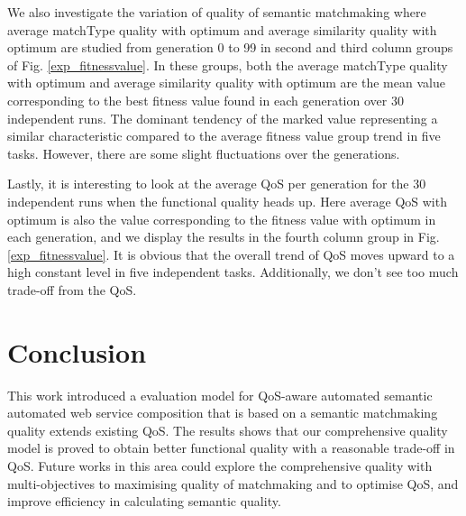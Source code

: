 \documentclass{llncs}
\begin{document}
We also investigate the variation of quality of semantic matchmaking where average matchType quality with optimum and average similarity quality with optimum are studied from generation 0 to 99 in second and third column groups of Fig. \ref{exp_fitnessvalue}. In these groups,  both the average matchType quality with optimum and average similarity quality with optimum are the mean value corresponding to the best fitness value found in each generation over 30 independent runs. The dominant tendency of the marked value representing a similar characteristic compared to the average fitness value group trend in five tasks. However, there are some slight fluctuations over the generations.

Lastly, it is interesting to look at the average QoS per generation for the 30 independent runs when the functional quality heads up. Here average QoS with optimum is also the value corresponding to the fitness value with optimum in each generation, and we display the results in the fourth column group in Fig. \ref{exp_fitnessvalue}. It is obvious that the overall trend of QoS moves upward to a high constant level in five independent tasks. Additionally, we don't see too much trade-off from the QoS.


\section{Conclusion}\label{conclusion}
This work introduced a evaluation model for QoS-aware automated semantic automated web service composition that is based on a semantic matchmaking quality extends existing QoS. The results shows that our comprehensive quality model is proved to obtain better functional quality with a reasonable trade-off in QoS. Future works in this area could explore the comprehensive quality with multi-objectives to maximising quality of matchmaking and to optimise QoS, and improve efficiency in calculating semantic quality.


\end{document}
